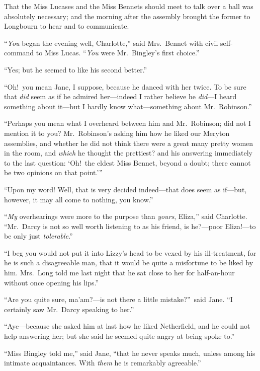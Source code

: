 \documentclass[12pt,english]{book}
\begin{document}
That the Miss Lucases and the Miss Bennets should meet to talk over
a ball was absolutely necessary; and the morning after the assembly
brought the former to Longbourn to hear and to communicate.

{}``\textit{You} began the evening well, Charlotte,'' said Mrs.\ Bennet
with civil self-command to Miss Lucas. {}``\textit{You} were Mr.\ Bingley's
first choice.''

{}``Yes; but he seemed to like his second better.''

{}``Oh!\ you mean Jane, I suppose, because he danced with her twice.
To be sure that \textit{did} seem as if he admired her\mbox{---}indeed
I rather believe he \textit{did}---I heard something about it\mbox{---}but
I hardly know what\mbox{---}something about Mr.\ Robinson.''

{}``Perhaps you mean what I overheard between him and Mr.\ Robinson;
did not I mention it to you? Mr.\ Robinson's asking him how he liked
our Meryton assemblies, and whether he did not think there were a
great many pretty women in the room, and \textit{which} he thought
the prettiest? and his answering immediately to the last question:
`Oh!\ the eldest Miss Bennet, beyond a doubt; there cannot be two
opinions on that point.'''

{}``Upon my word! Well, that is very decided indeed\mbox{---}that
does seem as if\mbox{---}but, however, it may all come to nothing,
you know.''

{}``\textit{My} overhearings were more to the purpose than \textit{yours},
Eliza,'' said Charlotte. {}``Mr.\ Darcy is not so well worth listening
to as his friend, is he?\mbox{---}poor Eliza!\mbox{---}to be only
just \textit{tolerable}.''

{}``I beg you would not put it into Lizzy's head to be vexed by his
ill-treatment, for he is such a disagreeable man, that it would be
quite a misfortune to be liked by him. Mrs.\ Long told me last night
that he sat close to her for half-an-hour without once opening his
lips.''

{}``Are you quite sure, ma'am?\mbox{---}is not there a little mistake?''\ said
Jane. {}``I certainly saw Mr.\ Darcy speaking to her.''

{}``Aye\mbox{---}because she asked him at last how he liked Netherfield,
and he could not help answering her; but she said he seemed quite
angry at being spoke to.''

{}``Miss Bingley told me,'' said Jane, {}``that he never speaks
much, unless among his intimate acquaintances. With \textit{them}
he is remarkably agreeable.''
\end{document}
